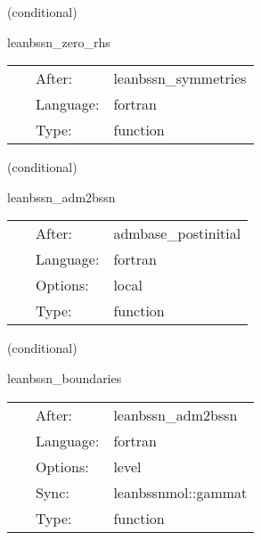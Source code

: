    (conditional) 

\hspace{5mm} leanbssn\_zero\_rhs 

\hspace{5mm}{\it set all rhs functions to zero to prevent spurious nans } 


\hspace{5mm}

 \begin{tabular*}{160mm}{cll} 
~ & After:  & leanbssn\_symmetries \\ 
~ & Language:  & fortran \\ 
~ & Type:  & function \\ 
\end{tabular*} 


\vspace{5mm}

   (conditional) 

\hspace{5mm} leanbssn\_adm2bssn 

\hspace{5mm}{\it convert initial data into bssn variables } 


\hspace{5mm}

 \begin{tabular*}{160mm}{cll} 
~ & After:  & admbase\_postinitial \\ 
~ & Language:  & fortran \\ 
~ & Options:  & local \\ 
~ & Type:  & function \\ 
\end{tabular*} 


\vspace{5mm}

   (conditional) 

\hspace{5mm} leanbssn\_boundaries 

\hspace{5mm}{\it boundary enforcement } 


\hspace{5mm}

 \begin{tabular*}{160mm}{cll} 
~ & After:  & leanbssn\_adm2bssn \\ 
~ & Language:  & fortran \\ 
~ & Options:  & level \\ 
~ & Sync:  & leanbssnmol::gammat \\ 
~ & Type:  & function \\ 
\end{tabular*} 


